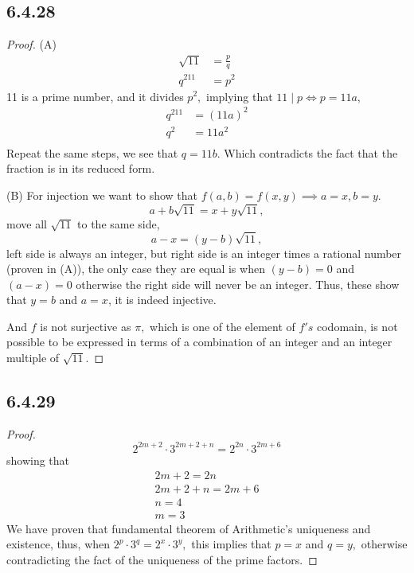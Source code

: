 \documentclass{article}
\begin{document}
\subsection*{6.4.28}


\begin{proof}
    (A)  \begin{align*}
        \sqrt{11}&=\frac{p}q\\
        q^211&=p^2
    \end{align*}
   11 is a prime number, and it divides $p^2,$ implying that $11\mid p \iff p=11a,$ 
   \begin{align*}
       q^211&=(11a)^2\\
       q^2&=11a^2\\
   \end{align*}
   Repeat the same steps, we see that $q=11b.$ Which contradicts the fact that the fraction is in its reduced form. 

   (B) For injection we want to show that $f(a,b)=f(x,y)\implies a=x, b=y.$ $$a+b\sqrt{11}=x+y\sqrt{11},$$ move all $\sqrt{11}$ to the same side, $$a-x=(y-b)\sqrt{11},$$ left side is always an integer, but right side is an integer times a rational number (proven in (A)), the only case they are equal is when $(y-b)=0$ and $(a-x)=0$ otherwise the right side will never be an integer. Thus, these show that $y=b$ and $a=x$, it is indeed injective.

   And $f$ is not surjective as $\pi,$ which is one of the element of $f's$ codomain, is not possible to be expressed in terms of a combination of an integer and an integer multiple of $\sqrt{11}.$ 
\end{proof}

\subsection*{6.4.29}


\begin{proof}
    $$2^{2m+2}\cdot3^{2m+2+n}=2^{2n}\cdot3^{2m+6}$$ showing that \begin{gather*}
        2m+2=2n\\
        2m+2+n=2m+6\\
        n=4\\
        m=3
    \end{gather*}
    We have proven that fundamental theorem of Arithmetic's uniqueness and existence, thus, when $2^p\cdot3^q=2^x\cdot3^y,$ this implies that $p=x$ and $q=y,$ otherwise contradicting the fact of the uniqueness of the prime factors. 
\end{proof}
\end{document}
